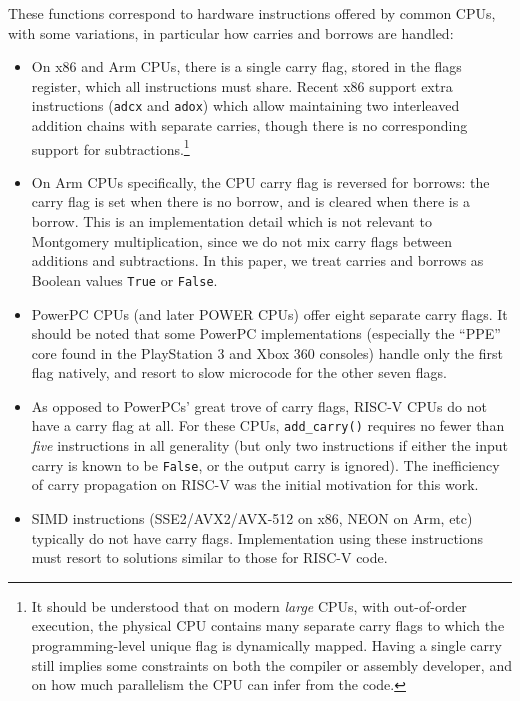 \documentclass{llncs}
\begin{document}
These functions correspond to hardware instructions offered by common
CPUs, with some variations, in particular how carries and borrows are
handled:
\begin{itemize}
    \item On x86 and Arm CPUs, there is a single carry flag, stored in
    the flags register, which all instructions must share. Recent x86
    support extra instructions (\verb+adcx+ and \verb+adox+) which allow
    maintaining two interleaved addition chains with separate carries,
    though there is no corresponding support for
    subtractions.\footnote{It should be understood that on modern
    \emph{large} CPUs, with out-of-order execution, the physical CPU
    contains many separate carry flags to which the programming-level
    unique flag is dynamically mapped. Having a single carry still
    implies some constraints on both the compiler or assembly developer,
    and on how much parallelism the CPU can infer from the code.}

    \item On Arm CPUs specifically, the CPU carry flag is reversed for
    borrows: the carry flag is set when there is no borrow, and is cleared
    when there is a borrow. This is an implementation detail which is not
    relevant to Montgomery multiplication, since we do not mix carry flags
    between additions and subtractions. In this paper, we treat carries
    and borrows as Boolean values \verb+True+ or \verb+False+.

    \item PowerPC CPUs (and later POWER CPUs) offer eight separate carry
    flags. It should be noted that some PowerPC implementations (especially
    the ``PPE'' core found in the PlayStation 3 and Xbox 360 consoles)
    handle only the first flag natively, and resort to slow microcode for
    the other seven flags.

    \item As opposed to PowerPCs' great trove of carry flags, RISC-V
    CPUs do not have a carry flag at all. For these CPUs,
    \verb+add_carry()+ requires no fewer than \emph{five} instructions
    in all generality (but only two instructions if either the input
    carry is known to be \verb+False+, or the output carry is ignored).
    The inefficiency of carry propagation on RISC-V was the initial
    motivation for this work.

    \item SIMD instructions (SSE2/AVX2/AVX-512 on x86, NEON on Arm, etc)
    typically do not have carry flags. Implementation using these
    instructions must resort to solutions similar to those for RISC-V
    code.

\end{itemize}
\end{document}
